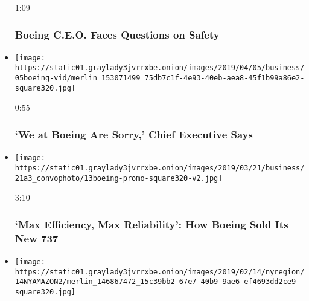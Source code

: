 \begin{itemize}
  1:09

  \hypertarget{boeing-ceo-faces-questions-on-safety}{%
  \subsubsection{Boeing C.E.O. Faces Questions on
  Safety}\label{boeing-ceo-faces-questions-on-safety}}
\item
  \href{https://www.nytimes3xbfgragh.onion/video/business/100000006446798/boeing-crash-report.html?action=click\&module=video-series-bar\&region=header\&pgtype=Article\&playlistId=video/business}{}

  \texttt{[image: https://static01.graylady3jvrrxbe.onion/images/2019/04/05/business/05boeing-vid/merlin\_153071499\_75db7c1f-4e93-40eb-aea8-45f1b99a86e2-square320.jpg]}

  0:55

  \hypertarget{we-at-boeing-are-sorry-chief-executive-says}{%
  \subsubsection{`We at Boeing Are Sorry,' Chief Executive
  Says}\label{we-at-boeing-are-sorry-chief-executive-says}}
\item
  \href{https://www.nytimes3xbfgragh.onion/video/business/100000006406119/boeing-737-max-marketing-video.html?action=click\&module=video-series-bar\&region=header\&pgtype=Article\&playlistId=video/business}{}

  \texttt{[image: https://static01.graylady3jvrrxbe.onion/images/2019/03/21/business/21a3\_convophoto/13boeing-promo-square320-v2.jpg]}

  3:10

  \hypertarget{max-efficiency-max-reliability-how-boeing-sold-its-new-737}{%
  \subsubsection{`Max Efficiency, Max Reliability': How Boeing Sold Its
  New
  737}\label{max-efficiency-max-reliability-how-boeing-sold-its-new-737}}
\item
  \href{https://www.nytimes3xbfgragh.onion/video/nyregion/100000006360664/amazon-nyc-headquarters.html?action=click\&module=video-series-bar\&region=header\&pgtype=Article\&playlistId=video/business}{}

  \texttt{[image: https://static01.graylady3jvrrxbe.onion/images/2019/02/14/nyregion/14NYAMAZON2/merlin\_146867472\_15c39bb2-67e7-40b9-9ae6-ef4693dd2ce9-square320.jpg]}


\end{itemize}
